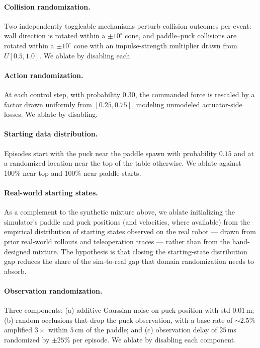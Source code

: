 \documentclass{article}
\begin{document}
    \paragraph{Collision randomization.} Two independently toggleable mechanisms perturb collision outcomes per event: wall direction is rotated within a $\pm 10^\circ$ cone, and paddle--puck collisions are rotated within a $\pm 10^\circ$ cone with an impulse-strength multiplier drawn from $U[0.5, 1.0]$. We ablate by disabling each.

    \paragraph{Action randomization.} At each control step, with probability $0.30$, the commanded force is rescaled by a factor drawn uniformly from $[0.25, 0.75]$, modeling unmodeled actuator-side losses. We ablate by disabling.

    \paragraph{Starting data distribution.} Episodes start with the puck near the paddle spawn with probability $0.15$ and at a randomized location near the top of the table otherwise. We ablate against $100\%$ near-top and $100\%$ near-paddle starts.

    \paragraph{Real-world starting states.} As a complement to the synthetic mixture above, we ablate initializing the simulator's paddle and puck positions (and velocities, where available) from the empirical distribution of starting states observed on the real robot --- drawn from prior real-world rollouts and teleoperation traces --- rather than from the hand-designed mixture. The hypothesis is that closing the starting-state distribution gap reduces the share of the sim-to-real gap that domain randomization needs to absorb.

    \paragraph{Observation randomization.} Three components: (a) additive Gaussian noise on puck position with std $0.01$\,m; (b) random occlusions that drop the puck observation, with a base rate of $\sim 2.5\%$ amplified $3\times$ within $5$\,cm of the paddle; and (c) observation delay of $25$\,ms randomized by $\pm 25\%$ per episode. We ablate by disabling each component.
\end{document}
